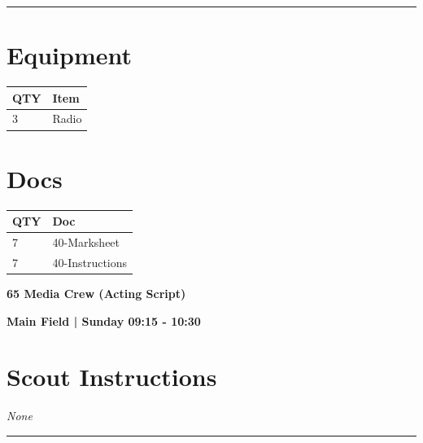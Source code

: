 \documentclass[10pt]{article}
\newcommand{\newtitle}[1]{\begin{center}{\Huge\bfseries #1 }\\ \vspace{5mm}\end{center}}
\newcommand{\newsubtitle}[1]{\begin{center}{\color{grey}\Large\bfseries #1 }\\ \vspace{5mm}\end{center}}
\begin{document}
			\vspace{0.5cm}
	\hrule
	\vspace{0.5cm}

	\begin{multicols}{2}

		\section*{\faWrench \: Equipment}

		
	\begin{center}
			\begin{tabular}{p{2cm}p{4cm}}


				\textbf{QTY} & \textbf{Item} \\\toprule
												3&Radio\\\midrule
								\end{tabular}

			\end{center}

		
		\vfill\null
		\columnbreak

			\section*{\faFile \: Docs}
		 	\begin{center}
			\begin{tabular}{p{2cm}p{4cm}}

			\textbf{QTY} & \textbf{Doc} \\\toprule
										7&40-Marksheet\\\midrule
										7&40-Instructions\\\midrule
							\end{tabular}
			\end{center}
	

		\vfill\null

		\end{multicols}



	\vspace{1cm}


	\clearpage
		\newtitle{65 Media Crew (Acting Script) }
	\newsubtitle{Main Field | Sunday 09:15 - 10:30}
		\setcounter{section}{64}
	\section*{Scout Instructions}
		\textit{None}
	
	\vspace{0.5cm}
	\hrule
	\vspace{0.5cm}
\end{document}

